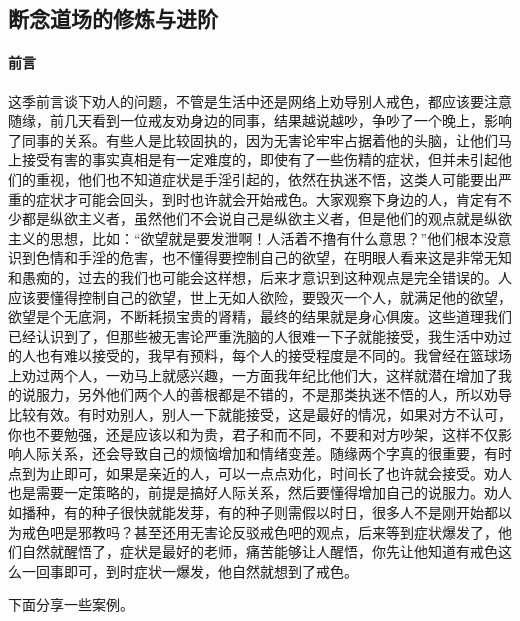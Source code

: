 \subsection{断念道场的修炼与进阶}

\paragraph*{前言}

这季前言谈下劝人的问题，不管是生活中还是网络上劝导别人戒色，都应该要注意随缘，前几天看到一位戒友劝身边的同事，结果越说越吵，争吵了一个晚上，影响了同事的关系。有些人是比较固执的，因为无害论牢牢占据着他的头脑，让他们马上接受有害的事实真相是有一定难度的，即使有了一些伤精的症状，但并未引起他们的重视，他们也不知道症状是手淫引起的，依然在执迷不悟，这类人可能要出严重的症状才可能会回头，到时也许就会开始戒色。大家观察下身边的人，肯定有不少都是纵欲主义者，虽然他们不会说自己是纵欲主义者，但是他们的观点就是纵欲主义的思想，比如：“欲望就是要发泄啊！人活着不撸有什么意思？”他们根本没意识到色情和手淫的危害，也不懂得要控制自己的欲望，在明眼人看来这是非常无知和愚痴的，过去的我们也可能会这样想，后来才意识到这种观点是完全错误的。人应该要懂得控制自己的欲望，世上无如人欲险，要毁灭一个人，就满足他的欲望，欲望是个无底洞，不断耗损宝贵的肾精，最终的结果就是身心俱废。这些道理我们已经认识到了，但那些被无害论严重洗脑的人很难一下子就能接受，我生活中劝过的人也有难以接受的，我早有预料，每个人的接受程度是不同的。我曾经在篮球场上劝过两个人，一劝马上就感兴趣，一方面我年纪比他们大，这样就潜在增加了我的说服力，另外他们两个人的善根都是不错的，不是那类执迷不悟的人，所以劝导比较有效。有时劝别人，别人一下就能接受，这是最好的情况，如果对方不认可，你也不要勉强，还是应该以和为贵，君子和而不同，不要和对方吵架，这样不仅影响人际关系，还会导致自己的烦恼增加和情绪变差。随缘两个字真的很重要，有时点到为止即可，如果是亲近的人，可以一点点劝化，时间长了也许就会接受。劝人也是需要一定策略的，前提是搞好人际关系，然后要懂得增加自己的说服力。劝人如播种，有的种子很快就能发芽，有的种子则需假以时日，很多人不是刚开始都以为戒色吧是邪教吗？甚至还用无害论反驳戒色吧的观点，后来等到症状爆发了，他们自然就醒悟了，症状是最好的老师，痛苦能够让人醒悟，你先让他知道有戒色这么一回事即可，到时症状一爆发，他自然就想到了戒色。

下面分享一些案例。

